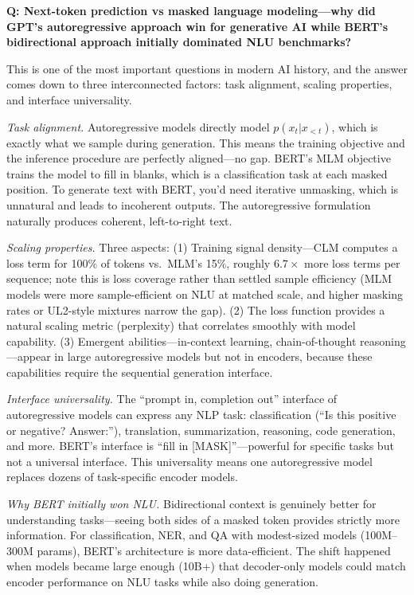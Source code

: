 \begin{interviewq}
\textbf{Q: Next-token prediction vs masked language modeling---why did GPT's autoregressive approach win for generative AI while BERT's bidirectional approach initially dominated NLU benchmarks?}

 \quad {} \quad \badgefreq{\freqhigh}

\stronganswer This is one of the most important questions in modern AI history, and the answer comes down to three interconnected factors: task alignment, scaling properties, and interface universality.

\textit{Task alignment.} Autoregressive models directly model $p(x_t | x_{<t})$, which is exactly what we sample during generation. This means the training objective and the inference procedure are perfectly aligned---no gap. BERT's MLM objective trains the model to fill in blanks, which is a classification task at each masked position. To generate text with BERT, you'd need iterative unmasking, which is unnatural and leads to incoherent outputs. The autoregressive formulation naturally produces coherent, left-to-right text.

\textit{Scaling properties.} Three aspects: (1) Training signal density---CLM computes a loss term for 100\% of tokens vs.\ MLM's 15\%, roughly $6.7\times$ more loss terms per sequence; note this is loss coverage rather than settled sample efficiency (MLM models were more sample-efficient on NLU at matched scale, and higher masking rates or UL2-style mixtures narrow the gap). (2) The loss function provides a natural scaling metric (perplexity) that correlates smoothly with model capability. (3) Emergent abilities---in-context learning, chain-of-thought reasoning---appear in large autoregressive models but not in encoders, because these capabilities require the sequential generation interface.

\textit{Interface universality.} The ``prompt in, completion out'' interface of autoregressive models can express any NLP task: classification (``Is this positive or negative? Answer:''), translation, summarization, reasoning, code generation, and more. BERT's interface is ``fill in [MASK]''---powerful for specific tasks but not a universal interface. This universality means one autoregressive model replaces dozens of task-specific encoder models.

\textit{Why BERT initially won NLU.} Bidirectional context is genuinely better for understanding tasks---seeing both sides of a masked token provides strictly more information. For classification, NER, and QA with modest-sized models (100M--300M params), BERT's architecture is more data-efficient. The shift happened when models became large enough (10B+) that decoder-only models could match encoder performance on NLU tasks while also doing generation.


\end{interviewq}
